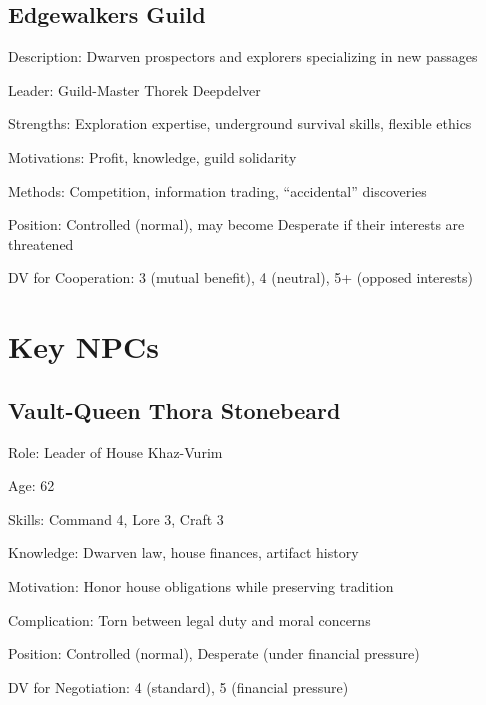 \documentclass[11pt]{article}
\newenvironment{npc}[1]{\begin{description}[leftmargin=*,style=standard]\item[\textbf{#1}]}{\end{description}}
\newenvironment{faction}[1]{\begin{description}[leftmargin=*,style=standard]\item[\textbf{#1}]}{\end{description}}
\begin{document}
\subsection{Edgewalkers Guild}
\begin{faction}{Edgewalkers Guild}
\item[Description:] Dwarven prospectors and explorers specializing in new passages
\item[Leader:] Guild-Master Thorek Deepdelver
\item[Strengths:] Exploration expertise, underground survival skills, flexible ethics
\item[Motivations:] Profit, knowledge, guild solidarity
\item[Methods:] Competition, information trading, ``accidental'' discoveries
\item[Position:] Controlled (normal), may become Desperate if their interests are threatened
\item[DV for Cooperation:] 3 (mutual benefit), 4 (neutral), 5+ (opposed interests)
\end{faction}

\section{Key NPCs}

\subsection{Vault-Queen Thora Stonebeard}
\begin{npc}{Vault-Queen Thora Stonebeard}
\item[Role:] Leader of House Khaz-Vurim
\item[Age:] 62
\item[Skills:] Command 4, Lore 3, Craft 3
\item[Knowledge:] Dwarven law, house finances, artifact history
\item[Motivation:] Honor house obligations while preserving tradition
\item[Complication:] Torn between legal duty and moral concerns
\item[Position:] Controlled (normal), Desperate (under financial pressure)
\item[DV for Negotiation:] 4 (standard), 5 (financial pressure)
\end{npc}
\end{document}
